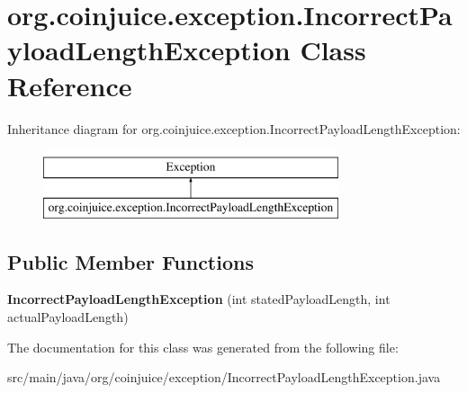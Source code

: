\hypertarget{classorg_1_1coinjuice_1_1exception_1_1_incorrect_payload_length_exception}{\section{org.\-coinjuice.\-exception.\-Incorrect\-Payload\-Length\-Exception Class Reference}
\label{classorg_1_1coinjuice_1_1exception_1_1_incorrect_payload_length_exception}
}
Inheritance diagram for org.\-coinjuice.\-exception.\-Incorrect\-Payload\-Length\-Exception\-:\begin{figure}[H]
\begin{center}
\leavevmode
\includegraphics[height=2.000000cm]{classorg_1_1coinjuice_1_1exception_1_1_incorrect_payload_length_exception}
\end{center}
\end{figure}
\subsection*{Public Member Functions}
\begin{DoxyCompactItemize}
\item 
\hypertarget{classorg_1_1coinjuice_1_1exception_1_1_incorrect_payload_length_exception_a9e17d008690846059b58e400d30a6237}{{\bfseries Incorrect\-Payload\-Length\-Exception} (int stated\-Payload\-Length, int actual\-Payload\-Length)}\label{classorg_1_1coinjuice_1_1exception_1_1_incorrect_payload_length_exception_a9e17d008690846059b58e400d30a6237}

\end{DoxyCompactItemize}


The documentation for this class was generated from the following file\-:\begin{DoxyCompactItemize}
\item 
src/main/java/org/coinjuice/exception/Incorrect\-Payload\-Length\-Exception.\-java\end{DoxyCompactItemize}

